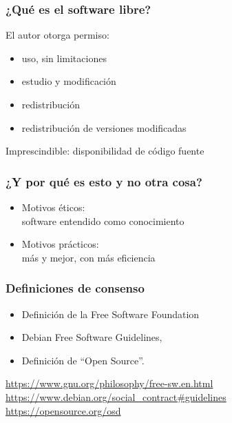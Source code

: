 \documentclass[17pt,aspectratio=169]{beamer}
\begin{document}
\begin{frame}
\frametitle{¿Qué es el software libre?}

El autor otorga permiso:

\begin{itemize}
\item uso, sin limitaciones
\item estudio y modificación
\item redistribución
\item redistribución de versiones modificadas
\end{itemize}

Imprescindible: disponibilidad de código fuente

\end{frame}


\begin{frame}
\frametitle{¿Y por qué es esto y no otra cosa?}

\begin{itemize}
\item Motivos éticos: \\
  software entendido como conocimiento
\item Motivos prácticos: \\
  más y mejor, con más eficiencia
\end{itemize}

\end{frame}


\begin{frame}
\frametitle{Definiciones de consenso}

\begin{itemize}
\item Definición de la Free Software Foundation
\item Debian Free Software Guidelines, 
\item Definición de ``Open Source''.
\end{itemize}

\begin{flushright}
{\footnotesize
  \url{https://www.gnu.org/philosophy/free-sw.en.html} \\
  \url{https://www.debian.org/social_contract\#guidelines} \\ 
  \url{https://opensource.org/osd} \\
}
\end{flushright}

\end{frame}
\end{document}
